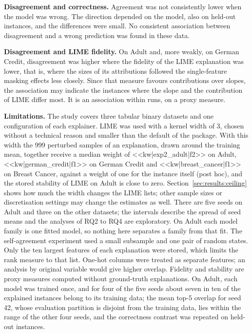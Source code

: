 \documentclass{cys}
\begin{document}
\textbf{Disagreement and correctness.} Agreement was
not consistently lower when the model was wrong. The direction depended on the model, also
on held-out instances, and the differences were small. No consistent association between
disagreement and a wrong prediction was found in these data.

\textbf{Disagreement and LIME fidelity.} On Adult and, more weakly, on German Credit, disagreement was higher where the
fidelity of the LIME explanation was lower, that is, where the sizes of its attributions
followed the single-feature masking effects less closely. Since that measure favours
contributions over slopes, the association may indicate the instances where the slope and
the contribution of LIME differ most. It is an association within runs, on a proxy
measure.

\textbf{Limitations.} The study covers three tabular binary datasets and one
configuration of each explainer. LIME was used with a kernel width of 3, chosen
without a technical reason and smaller than the default of the package.
With this width the 999 perturbed samples of an explanation, drawn around the training
mean, together receive a median weight of <<kw|exp2_adult|f2>> on Adult,
<<kw|german_credit|f1>> on German Credit and <<kw|breast_cancer|f1>> on Breast Cancer,
against a weight of one for the instance itself (post hoc), and the stored stability of
LIME on Adult is close to zero. Section~\ref{sec:results:ceiling} shows how much the
width changes the LIME lists; other sample sizes or discretisation settings may change the
estimates as well. There are five seeds on Adult and three on
the other datasets; the intervals describe the spread of seed means and the analyses of
RQ2 to RQ4 are exploratory. On Adult each model family is one fitted model, so nothing
here separates a family from that fit. The self-agreement experiment used a small
subsample and one pair of random states. Only the ten largest features of each explanation were stored, which limits
the rank measure to that list. One-hot columns were treated as separate features; an
analysis by original variable would give higher overlap. Fidelity and stability are proxy measures computed without ground-truth explanations. On
Adult, each model was trained once, and for four of the five seeds about seven in ten of
the explained instances belong to its training data; the mean top-5 overlap for seed 42,
whose evaluation partition is disjoint from the training data, lies within the range of
the other four seeds, and the correctness contrast was repeated on held-out instances.
\end{document}
